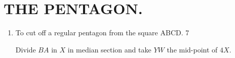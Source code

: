 
\chapter{THE PENTAGON.}

\begin{enumerate}

    \item To cut off a regular pentagon from the square ABCD. 7

        Divide $BA$ in $X$ in median section and take $YW$ the mid-point of
        $4X$.

%
%
%
%
%
%
%
%
%
%
%
%
%
%
%
%
%
%
%
%
%
%
%
%
%
%
%
%
%
%
%
%
%
%
%
%
%

\end{enumerate}
